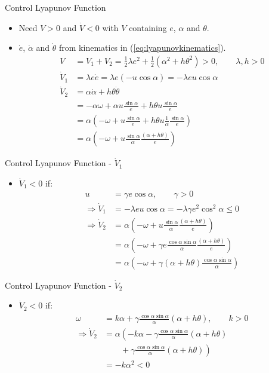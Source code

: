 \documentclass[hyperref={pdfpagelabels=false}]{beamer}
\begin{document}
\begin{frame}{Control Lyapunov Function}
\begin{itemize}
\item Need $V>0$ and $\dot{V}<0$ with $V$ containing $e$, $\alpha$ and $\theta$.
\item $\dot{e}$, $\dot{\alpha}$ and $\dot{\theta}$ from kinematics in (\ref{eq:lyapunovkinematics}).
\begin{align*}
V &= V_1 + V_2 = \frac{1}{2}\lambda e^2 + \frac{1}{2}\left(\alpha^2+h\theta^2\right) > 0, \qquad \lambda,h>0 \\
\dot{V}_1 &= \lambda e\dot{e} = \lambda e (-u\cos\alpha) = -\lambda eu\cos\alpha \\
\dot{V}_2 &= \alpha\dot{\alpha}+h\theta\dot{\theta} \\
&= -\alpha\omega + \alpha u\frac{\sin\alpha}{e} + h\theta u\frac{\sin\alpha}{e} \\
&= \alpha\left(-\omega + u\frac{\sin\alpha}{e} + h\theta u\frac{1}{\alpha}\frac{\sin\alpha}{e}\right) \\
&= \alpha\left(-\omega + u\frac{\sin\alpha}{\alpha}\frac{(\alpha+h\theta)}{e}\right)
\end{align*}
\end{itemize}
\end{frame}

\begin{frame}{Control Lyapunov Function - $\dot{V}_1$}
\begin{itemize}
\item $\dot{V}_1<0$ if:
\begin{align*}
u &= \gamma e\cos\alpha, \qquad \gamma>0 \\
\Rightarrow \dot{V}_1 &= -\lambda eu\cos\alpha = -\lambda\gamma e^2\cos^2\alpha \leq 0 \\
\Rightarrow \dot{V}_2 &= \alpha\left(-\omega+u\frac{\sin\alpha}{\alpha}\frac{(\alpha+h\theta)}{e}\right) \\
&= \alpha\left(-\omega+\gamma e\frac{\cos\alpha\sin\alpha}{\alpha}\frac{(\alpha+h\theta)}{e}\right) \\
&= \alpha\left(-\omega+\gamma(\alpha+h\theta)\frac{\cos\alpha\sin\alpha}{\alpha}\right)
\end{align*}
\end{itemize}
\end{frame}

\begin{frame}{Control Lyapunov Function - $\dot{V}_2$}
\begin{itemize}
\item $\dot{V}_2<0$ if:
\begin{align*}
\omega &= k\alpha + \gamma\frac{\cos\alpha\sin\alpha}{\alpha}\left(\alpha+h\theta\right), \qquad k>0 \\
\Rightarrow \dot{V}_2 &= \alpha\left(-k\alpha-\gamma\frac{\cos\alpha\sin\alpha}{\alpha}(\alpha+h\theta)\right. \\
&\qquad + \left.\gamma\frac{\cos\alpha\sin\alpha}{\alpha}(\alpha+h\theta)\right) \\
&= -k\alpha^2 < 0
\end{align*}
\end{itemize}
\end{frame}
\end{document}
